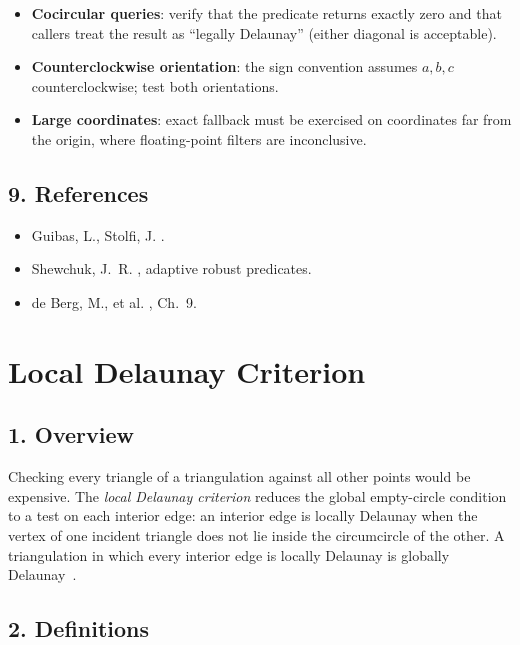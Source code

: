 \begin{itemize}
\item \textbf{Cocircular queries}: verify that the predicate returns exactly
  zero and that callers treat the result as ``legally Delaunay'' (either
  diagonal is acceptable).
\item \textbf{Counterclockwise orientation}: the sign convention assumes
  $a,b,c$ counterclockwise; test both orientations.
\item \textbf{Large coordinates}: exact fallback must be exercised on
  coordinates far from the origin, where floating-point filters are
  inconclusive.
\end{itemize}

\subsection{9. References}

\begin{itemize}
\item Guibas, L., Stolfi, J. \cite{guibas1985}.
\item Shewchuk, J.~R. \cite{shewchuk1997}, adaptive robust predicates.
\item de Berg, M., et al. \cite{deberg2008}, Ch.~9.
\end{itemize}

\section{Local Delaunay Criterion}
\label{sec:delaunay_local_criterion}

\subsection{1. Overview}

Checking every triangle of a triangulation against all other points would be
expensive. The \emph{local Delaunay criterion}
reduces the global empty-circle condition to a test on each interior edge: an
interior edge is locally Delaunay when the vertex of one incident triangle does
not lie inside the circumcircle of the other. A triangulation in which every
interior edge is locally Delaunay is globally Delaunay~\cite{deberg2008}.

\subsection{2. Definitions}

